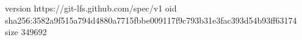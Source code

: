 version https://git-lfs.github.com/spec/v1
oid sha256:3582a9f515a794d4880a7715fbbe009117f9c793b31e3fac393d54b93ff63174
size 349692
